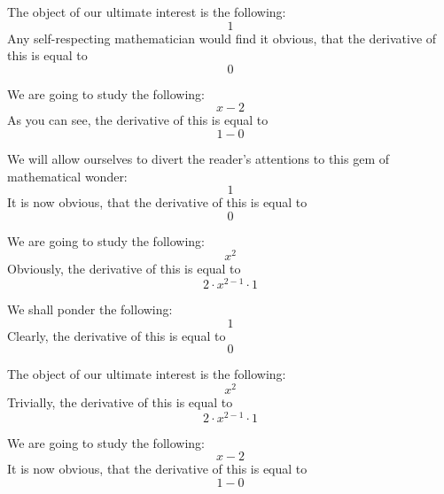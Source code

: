 \documentclass{article}
\begin{document}
The object of our ultimate interest is the following:
\begin{equation}
1 
\end{equation}
Any self-respecting mathematician would find it obvious, that the derivative of this is equal to
\begin{equation}
0 
\end{equation}

We are going to study the following:
\begin{equation}
x - 2 
\end{equation}
As you can see, the derivative of this is equal to
\begin{equation}
1 - 0 
\end{equation}

We will allow ourselves to divert the reader's attentions to this gem of mathematical wonder:
\begin{equation}
1 
\end{equation}
It is now obvious, that the derivative of this is equal to
\begin{equation}
0 
\end{equation}

We are going to study the following:
\begin{equation}
x ^{2 } 
\end{equation}
Obviously, the derivative of this is equal to
\begin{equation}
2 \cdot x ^{2 - 1 } \cdot 1 
\end{equation}

We shall ponder the following:
\begin{equation}
1 
\end{equation}
Clearly, the derivative of this is equal to
\begin{equation}
0 
\end{equation}

The object of our ultimate interest is the following:
\begin{equation}
x ^{2 } 
\end{equation}
Trivially, the derivative of this is equal to
\begin{equation}
2 \cdot x ^{2 - 1 } \cdot 1 
\end{equation}

We are going to study the following:
\begin{equation}
x - 2 
\end{equation}
It is now obvious, that the derivative of this is equal to
\begin{equation}
1 - 0 
\end{equation}
\end{document}
